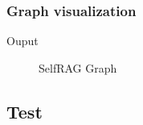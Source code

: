 \documentclass[letterpaper,11pt,english]{sphinxmanual}
\begin{document}
\subsubsection{Graph visualization}
\label{\detokenize{rag:graph-visualization}}
\begin{sphinxVerbatim}[commandchars=\\\{\}]
    

\end{sphinxVerbatim}

\sphinxAtStartPar
Ouput

\begin{figure}[htbp]
\centering
\capstart

\noindent{}
\caption{Self\sphinxhyphen{}RAG Graph}\label{\detokenize{rag:id58}}\label{\detokenize{rag:fig-self-rag-graph}}\end{figure}


\subsection{Test}
\label{\detokenize{rag:test}}
\end{document}
